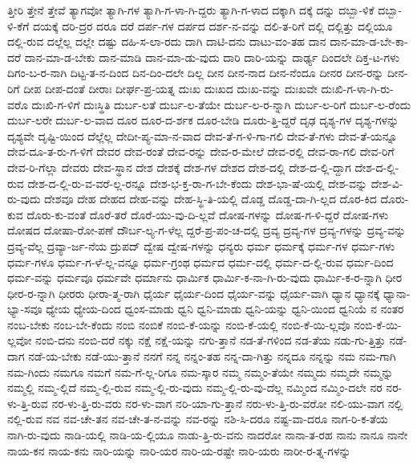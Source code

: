 {ತ್ತೀರಿ
ತ್ತೇನೆ
ತ್ತೇವೆ
ತ್ಯಾಗವೋ
ತ್ಯಾಗಿ-ಗಳ
ತ್ಯಾಗಿ-ಗ-ಳಾ-ಗಿ-ದ್ದರು
ತ್ಯಾಗಿ-ಗ-ಳಾದ
ದಕ್ಕಾಗಿ
ದಕ್ಕೆ
ದನ್ನು
ದಬ್ಬಾ-ಳಿಕೆ
ದಬ್ಬಾ-ಳಿ-ಕೆಗೆ
ದಯಕ್ಕೆ
ದರಿ-ದ್ರರ
ದರೂ
ದರೆ
ದರ್ಪ-ಗಳ
ದರ್ಪದ
ದರ್ಶ-ನ-ವನ್ನು
ದಲಿ-ತ-ರಿಗೆ
ದಲ್ಲಿ
ದಲ್ಲಿತ್ತು
ದಲ್ಲಿಯೂ
ದಲ್ಲಿ-ರುವ
ದಲ್ಲೆಲ್ಲ
ದಲ್ಲೇ
ದಷ್ಟು
ದಹಿ-ಸ-ಲಾ-ರದು
ದಾಗಿ
ದಾಟಿ-ದನು
ದಾಟು-ವಂ-ತಹ
ದಾನ
ದಾನ-ಮಾ-ಡ-ಬೇ-ಕಾ-ದರೆ
ದಾನ-ಮಾ-ಡ-ಬೇಕು
ದಾನ-ಮಾಡಿ
ದಾನ-ಮಾ-ಡು-ವುದು
ದಾರಿ
ದಾರಿ-ಯನ್ನು
ದಾರ್ಢ್ಯ
ದಿಂದಲೇ
ದಿಕ್ತ-ಟ-ಗಳು
ದಿಗಂ-ಬ-ರ-ನಾಗಿ
ದಿಟ್ಟ-ತ-ನ-ದಿಂದ
ದಿನ-ದಿಂ-ದಲೇ
ದಿಲ್ಲ
ದೀನ
ದೀನ-ನಾದ
ದೀನ-ನೆಂದೂ
ದೀನರ
ದೀನ-ರನ್ನು
ದೀನ-ರಿಗೆ
ದೀಪ
ದೀಪ-ದಂತೆ
ದೀರಾಃ
ದೀರ್ಘ-ಪ್ರ-ಯತ್ನ
ದುಃಖ
ದುಃಖದ
ದುಃಖ-ವನ್ನು
ದುಃಖವೇ
ದುಃಖಿ-ಗ-ಳಾ-ಗಿ-ರು-ವರೊ
ದುಃಖಿ-ಗ-ಳಿಗೆ
ದುಃಸ್ಥಿತಿ
ದುರ್ಬ-ಲತೆ
ದುರ್ಬ-ಲ-ತೆಯೇ
ದುರ್ಬ-ಲ-ರ-ನ್ನಾಗಿ
ದುರ್ಬ-ಲ-ರಿಗೆ
ದುರ್ಬ-ಲ-ರೆಂದು
ದುರ್ಬ-ಲರೇ
ದುರ್ಬ-ಲ-ವಾದ
ದೂರ
ದೂರ-ದ-ರ್ಶಕ
ದೂರ-ಬೇಡಿ
ದೂರು-ತ್ತಿ-ದ್ದರೆ
ದೃಢ
ದೃಶ್ಯ-ಗಳ
ದೃಶ್ಯ-ಗಳನ್ನು
ದೃಶ್ಯವೇ
ದೃಷ್ಟಿ-ಯಿಂದ
ದೆಲ್ಲೆಲ್ಲ
ದೇದೀ-ಪ್ಯ-ಮಾ-ನ-ವಾದ
ದೇವ-ತೆ-ಗ-ಳಿ-ಗಾ-ಗಲಿ
ದೇವ-ತೆ-ಗಳು
ದೇವ-ತೆ-ಯನ್ನೂ
ದೇವ-ದೂ-ತ-ರು-ಗ-ಳಿಗೆ
ದೇವರ
ದೇವ-ರಂತೆ
ದೇವ-ರನ್ನು
ದೇವ-ರ-ಮೇಲೆ
ದೇವ-ರಲ್ಲಿ
ದೇವ-ರಾ-ಗಲಿ
ದೇವ-ರಿಗೆ
ದೇವ-ರಿ-ಗೆಲ್ಲಾ
ದೇವರು
ದೇವ-ಸ್ಥಾನ
ದೇಶ
ದೇಶಕ್ಕೆ
ದೇಶ-ಗಳ
ದೇಶದ
ದೇಶ-ದಲ್ಲಿ
ದೇಶ-ದ-ಲ್ಲಿ-ದ್ದಾಗ
ದೇಶ-ದ-ಲ್ಲಿ-ರುವ
ದೇಶ-ದ-ಲ್ಲಿ-ರು-ವ-ವರೆ-ಲ್ಲ-ರನ್ನೂ
ದೇಶ-ಭ-ಕ್ತ-ರಾ-ಗ-ಬೇ-ಕೆಂದು
ದೇಶ-ಭಾ-ಷೆ-ಯಲ್ಲಿ
ದೇಶ-ವನ್ನು
ದೇಶ-ವಿ-ರು-ವುದು
ದೇಶವೂ
ದೇಹ
ದೇಹದ
ದೇಹ-ವನ್ನು
ದೇಹ-ಸ್ಥಿ-ತಿ-ಯಲ್ಲಿ
ದೊಡ್ಡ
ದೊಡ್ಡ-ದಾ-ಗಿ-ಲ್ಲದ
ದೊರ-ಕಿದ
ದೊರು-ಕುವ
ದೊರು-ಕು-ವಂತೆ
ದೊರೆ-ತರೆ
ದೊರೆ-ಯು-ವು-ದಿ-ಲ್ಲವೆ
ದೋಷ-ಗಳನ್ನು
ದೋಷ-ಗ-ಳಿ-ದ್ದರೆ
ದೋಷ-ಗಳು
ದೋಷದ
ದೋಷಾ-ರೋ-ಪಣೆ
ದೌರ್ಬ-ಲ್ಯ-ಗ-ಳೆಲ್ಲ
ದ್ದರೆ-ಪ್ರ-ಪಂ-ಚ-ದಲ್ಲಿ
ದ್ರವ್ಯ
ದ್ರವ್ಯ-ಗಳ
ದ್ರವ್ಯ-ಗಳನ್ನು
ದ್ರವ್ಯ-ವನ್ನು
ದ್ರವ್ಯ-ವೆಲ್ಲ
ದ್ರವ್ಯಾ-ರ್ಜ-ನೆಯ
ದ್ರುಪದ್
ದ್ವೇಷ
ದ್ವೇಷ-ಗಳನ್ನು
ಧನ್ಯರು
ಧರ್ಮ
ಧರ್ಮಕ್ಕೆ
ಧರ್ಮ-ಗಳ
ಧರ್ಮ-ಗಳು
ಧರ್ಮ-ಗಳೂ
ಧರ್ಮ-ಗ-ಳೆ-ಲ್ಲ-ವನ್ನೂ
ಧರ್ಮ-ಗ್ರಂಥ
ಧರ್ಮದ
ಧರ್ಮ-ದಲ್ಲಿ
ಧರ್ಮ-ದ-ಲ್ಲಿ-ರುವ
ಧರ್ಮ-ದಿಂದ
ಧರ್ಮ-ವನ್ನು
ಧರ್ಮವೂ
ಧರ್ಮವೇ
ಧರ್ಮಾನು
ಧಾರ್ಮಿಕ
ಧಾರ್ಮಿ-ಕ-ನಾ-ಗಿ-ರು-ವುದು
ಧಾರ್ಮಿ-ಕ-ರ-ನ್ನಾಗಿ
ಧೀರ
ಧೀರ-ರ-ನ್ನಾಗಿ
ಧೀರರು
ಧೀರಾ-ತ್ಮ-ರಾಗಿ
ಧೈರ್ಯ
ಧೈರ್ಯ-ದಿಂದ
ಧೈರ್ಯ-ವನ್ನು
ಧೈರ್ಯ-ವಾಗಿ
ಧ್ಯಾನ
ಧ್ಯಾನಕ್ಕೆ
ಧ್ಯಾನಾ-ಭ್ಯಾ-ಸವೂ
ಧ್ಯೇಯ
ಧ್ಯೇಯ-ದಿಂದ
ಧ್ವಂಸ-ಮಾಡು
ಧ್ವನಿ
ಧ್ವನಿ-ಮಾಡು
ಧ್ವನಿ-ಯನ್ನು
ಧ್ವನಿ-ಯಿಂದ
ಧ್ವನಿಯೆ
ನ
ನಂತರ
ನಂಬ-ಬೇಕು
ನಂಬ-ಬೇ-ಕೆಂದು
ನಂಬಿ
ನಂಬಿಕೆ
ನಂಬಿ-ಕೆ-ಯನ್ನು
ನಂಬಿ-ಕೆ-ಯಲ್ಲಿ
ನಂಬಿ-ಕೆ-ಯಿ-ಲ್ಲವೊ
ನಂಬಿ-ಕೆ-ಯಿ-ಲ್ಲವೋ
ನಂಬಿ-ದನು
ನಂಬಿ-ದರೆ
ನಕ್ಕು
ನಕ್ಷೆ
ನಕ್ಷೆ-ಯನ್ನು
ನಗು-ತ್ತಾನೆ
ನಡ-ತೆ-ಗಳಿಂದ
ನಡ-ತೆಯ
ನಡು-ಗು-ತ್ತಿತ್ತು
ನಡೆ-ದಾಗ
ನಡೆ-ಯ-ಬೇಕು
ನಡೆ-ಯು-ತ್ತಾನೆ
ನನಗೆ
ನನ್ನ
ನನ್ನಂ-ತಹ
ನನ್ನ-ದಾ-ಗಿತ್ತು
ನನ್ನದೂ
ನನ್ನನ್ನು
ನಮ
ನಮ-ಗಾಗಿ
ನಮ-ಗಿಂದು
ನಮಗೂ
ನಮಗೆ
ನಮ-ಗೆ-ಲ್ಲ-ರಿಗೂ
ನಮ-ಸ್ಕಾರ
ನಮ್ಮ
ನಮ್ಮಂ-ತೆಯೇ
ನಮ್ಮದು
ನಮ್ಮದೇ
ನಮ್ಮನ್ನು
ನಮ್ಮಲ್ಲಿ
ನಮ್ಮ-ಲ್ಲಿದೆ
ನಮ್ಮ-ಲ್ಲಿ-ರುವ
ನಮ್ಮ-ಲ್ಲಿ-ರು-ವುದು
ನಮ್ಮ-ಲ್ಲಿ-ರು-ವು-ದೆಲ್ಲ
ನಮ್ಮಿಂದ
ನಮ್ಮಿಂ-ದಲೇ
ನರ
ನರ-ಳು-ತ್ತಿ-ರುವ
ನರ-ಳು-ತ್ತಿ-ರು-ವರು
ನರ-ಳು-ವಾಗ
ನರಿ-ಯಾ-ಗು-ತ್ತಾನೆ
ನರು-ಳು-ತ್ತಿ-ರು-ವರೋ
ನಲಿ-ಯು-ವಾಗ
ನಲ್ಲಿ
ನಲ್ಲಿ-ರುವ
ನವ
ನವ-ಚೇ-ತನ
ನವ-ಚೇ-ತ-ನ-ವನ್ನು
ನವ-ರನ್ನು
ನಶಿ-ಸಿ-ದರೂ
ನಷ್ಟ-ವಾ-ದರೂ
ನಾಗ-ರಿ-ಕ-ತೆಯ
ನಾಗಿ-ರು-ವುದು
ನಾಡಿ-ಯಲ್ಲಿ
ನಾಡಿ-ಯ-ಲ್ಲಿಯೂ
ನಾಡು-ತ್ತಿ-ರು-ವನು
ನಾದರೋ
ನಾನಾ-ತ-ರಹ
ನಾನು
ನಾನೂ
ನಾನೇ
ನಾಯ-ಕನ
ನಾಯ-ಕನು
ನಾರಿ-ಯನ್ನು
ನಾರಿ-ಯರ
ನಾರಿ-ಯ-ರಷ್ಟೇ
ನಾರಿ-ಯರು
ನಾರೀ-ರ-ತ್ನ-ಗಳನ್ನು
}
